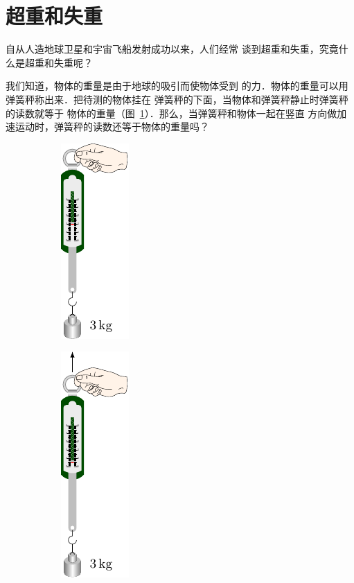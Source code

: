 \section{超重和失重}
    自从人造地球卫星和宇宙飞船发射成功以来，人们经常
谈到超重和失重，究竟什么是超重和失重呢？

    我们知道，物体的重量是由于地球的吸引而使物体受到
的力．物体的重量可以用弹簧秤称出来．把待测的物体挂在
弹簧秤的下面，当物体和弹簧秤静止时弹簧秤的读数就等于
物体的重量（图~\ref{fig_A_3-12a}）．那么，当弹簧秤和物体一起在竖直
方向做加速运动时，弹簧秤的读数还等于物体的重量吗？
\begin{figure}[htbp]
	\centering
	\begin{subfigure} {0.3\linewidth} 
		\centering
		\includegraphics{fig/A/3-12a.pdf} 
		\caption{}\label{fig_A_3-12a} 
	\end{subfigure}
	\hfil
	\begin{subfigure} {0.3\linewidth} 
		\centering
		\includegraphics{fig/A/3-12b.pdf} 
		\caption{}\label{fig_A_3-12b} 
	\end{subfigure}

\end{figure}
